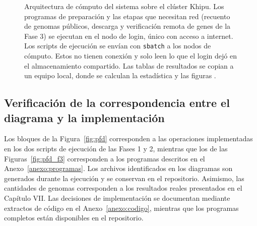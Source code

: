 \begin{figure}[htbp]
\caption[Arquitectura de cómputo del sistema]{Arquitectura de cómputo del
sistema sobre el clúster Khipu. Los programas de preparación y las etapas que
necesitan red (recuento de genomas públicos, descarga y verificación remota de genes de la Fase 3) se
ejecutan en el nodo de login, único con acceso a internet. Los scripts de
ejecución se envían con \texttt{sbatch} a los nodos de cómputo.
Estos no tienen conexión y solo leen lo que el login dejó en el almacenamiento
compartido. Las tablas de resultados se copian a un equipo local, donde se
calculan la estadística y las figuras .}

\label{fig:arquitectura}

\end{figure}

\subsection{Verificación de la correspondencia entre el diagrama y la implementación}

Los bloques de la Figura~\ref{fig:pfd} corresponden a las operaciones implementadas en los dos 
scripts de ejecución de las Fases 1 y 2, mientras que los de las
Figuras~\ref{fig:pfd_f3}  corresponden a los programas descritos en el Anexo~\ref{anexo:programas}. Los archivos
identificados en los diagramas son generados durante la ejecución y se conservan en el repositorio.
Asimismo, las cantidades de genomas corresponden a los resultados reales presentados 
en el Capítulo VII. Las decisiones de implementación se documentan mediante extractos de código en el 
Anexo~\ref{anexo:codigo}, mientras que los programas completos están disponibles en el repositorio.